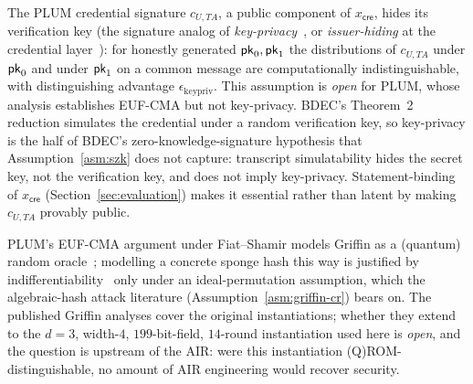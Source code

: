\begin{assumption}\label{asm:keypriv}
    The PLUM credential signature $c_{U,TA}$, a public component of $x_{\mathsf{cre}}$, hides its verification key (the signature analog of \emph{key-privacy}~\cite{bellare2001keyprivacy}, or \emph{issuer-hiding} at the credential layer~\cite{bobolz2021issuerhiding}): for honestly generated $\mathsf{pk}_0,\mathsf{pk}_1$ the distributions of $c_{U,TA}$ under $\mathsf{pk}_0$ and under $\mathsf{pk}_1$ on a common message are computationally indistinguishable, with distinguishing advantage $\epsilon_{\mathrm{keypriv}}$. This assumption is \emph{open} for PLUM, whose analysis establishes EUF-CMA but not key-privacy. BDEC's Theorem~2 reduction simulates the credential under a random verification key, so key-privacy is the half of BDEC's zero-knowledge-signature hypothesis that Assumption~\ref{asm:szk} does not capture: transcript simulatability hides the secret key, not the verification key, and does not imply key-privacy. Statement-binding of $x_{\mathsf{cre}}$ (Section~\ref{sec:evaluation}) makes it essential rather than latent by making $c_{U,TA}$ provably public.
\end{assumption}

\begin{assumption}\label{asm:qrom}
    PLUM's EUF-CMA argument under Fiat--Shamir models Griffin as a (quantum) random oracle~\cite{cryptoeprint:2019/190,grilo2021qrom}; modelling a concrete sponge hash this way is justified by indifferentiability~\cite{bertoni2008sponge} only under an ideal-permutation assumption, which the algebraic-hash attack literature (Assumption~\ref{asm:griffin-cr}) bears on. The published Griffin analyses cover the original instantiations; whether they extend to the $d=3$, width-$4$, $199$-bit-field, $14$-round instantiation used here is \emph{open}, and the question is upstream of the AIR: were this instantiation (Q)ROM-distinguishable, no amount of AIR engineering would recover security.
\end{assumption}

